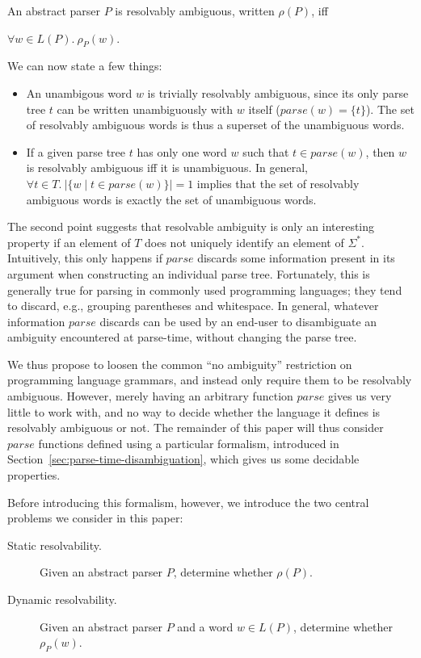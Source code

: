 \documentclass[runningheads]{llncs}
\newcommand{\T}{\Sigma} %
\newcommand{\parse}{\mathit{parse}} %
\begin{document}
\begin{definition}\label{def:resolvable-language}
  An abstract parser $P$ is resolvably ambiguous, written $\rho(P)$, iff

  $\forall w \in L(P).\ \rho_P(w)$.
\end{definition}

\noindent We can now state a few things:

\begin{itemize}
\item An unambigous word $w$ is trivially resolvably ambiguous, since its only parse tree $t$ can be written unambiguously with $w$ itself ($\parse(w) = \{t\}$). The set of resolvably ambiguous words is thus a superset of the unambiguous words.
\item If a given parse tree $t$ has only one word $w$ such that $t \in \parse(w)$, then $w$ is resolvably ambiguous iff it is unambiguous. In general, $\forall t \in T.\ \lvert\{w \mid t \in \parse(w)\}\rvert = 1$ implies that the set of resolvably ambiguous words is exactly the set of unambiguous words.
\end{itemize}

\noindent The second point suggests that resolvable ambiguity is only an interesting property if an element of $T$ does not uniquely identify an element of $\T^{*}$. Intuitively, this only happens if $\parse$ discards some information present in its argument when constructing an individual parse tree. Fortunately, this is generally true for parsing in commonly used programming languages; they tend to discard, e.g., grouping parentheses and whitespace. In general, whatever information $\parse$ discards can be used by an end-user to disambiguate an ambiguity encountered at parse-time, without changing the parse tree.

We thus propose to loosen the common ``no ambiguity'' restriction on programming language grammars, and instead only require them to be resolvably ambiguous. However, merely having an arbitrary function $\parse$ gives us very little to work with, and no way to decide whether the language it defines is resolvably ambiguous or not. The remainder of this paper will thus consider $\parse$ functions defined using a particular formalism, introduced in Section~\ref{sec:parse-time-disambiguation}, which gives us some decidable properties.

Before introducing this formalism, however, we introduce the two central problems we consider in this paper:

\begin{description}
\item[Static resolvability.] Given an abstract parser $P$, determine whether $\rho(P)$.
\item[Dynamic resolvability.] Given an abstract parser $P$ and a word $w \in L(P)$, determine whether $\rho_P(w)$.
\end{description}
\end{document}
